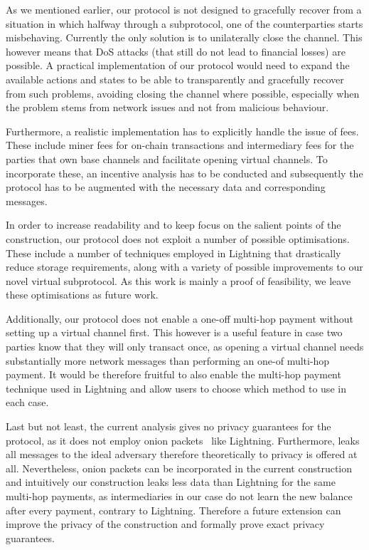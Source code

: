   As we mentioned earlier, our protocol is not designed to gracefully recover
  from a situation in which halfway through a subprotocol, one of the
  counterparties starts misbehaving. Currently the only solution is to
  unilaterally close the channel. This however means that DoS attacks (that
  still do not lead to financial losses) are possible. A practical
  implementation of our protocol would need to expand the available actions and
  states to be able to transparently and gracefully recover from such problems,
  avoiding closing the channel where possible, especially when the problem stems
  from network issues and not from malicious behaviour.

  Furthermore, a realistic implementation has to explicitly handle the issue of
  fees. These include miner fees for on-chain transactions and intermediary fees
  for the parties that own base channels and facilitate opening virtual
  channels. To incorporate these, an incentive analysis has to be conducted and
  subsequently the protocol has to be augmented with the necessary data and
  corresponding messages.

  In order to increase readability and to keep focus on the salient points of
  the construction, our protocol does not exploit a number of possible
  optimisations. These include a number of techniques employed in Lightning that
  drastically reduce storage requirements, along with a variety of possible
  improvements to our novel virtual subprotocol. As this work is mainly a proof
  of feasibility, we leave these optimisations as future work.

  Additionally, our protocol does not enable a one-off multi-hop payment without
  setting up a virtual channel first. This however is a useful feature in case
  two parties know that they will only transact once, as opening a virtual
  channel needs substantially more network messages than performing an one-of
  multi-hop payment. It would be therefore fruitful to also enable the multi-hop
  payment technique used in Lightning and allow users to choose which method to
  use in each case.

  Last but not least, the current analysis gives no privacy guarantees for the
  protocol, as it does not employ onion packets~\cite{sphinx} like Lightning.
  Furthermore, \fchan leaks all messages to the ideal adversary therefore
  theoretically to privacy is offered at all. Nevertheless, onion packets can be
  incorporated in the current construction and intuitively our construction
  leaks less data than Lightning for the same multi-hop payments, as
  intermediaries in our case do not learn the new balance after every payment,
  contrary to Lightning. Therefore a future extension can improve the privacy of
  the construction and formally prove exact privacy guarantees.
